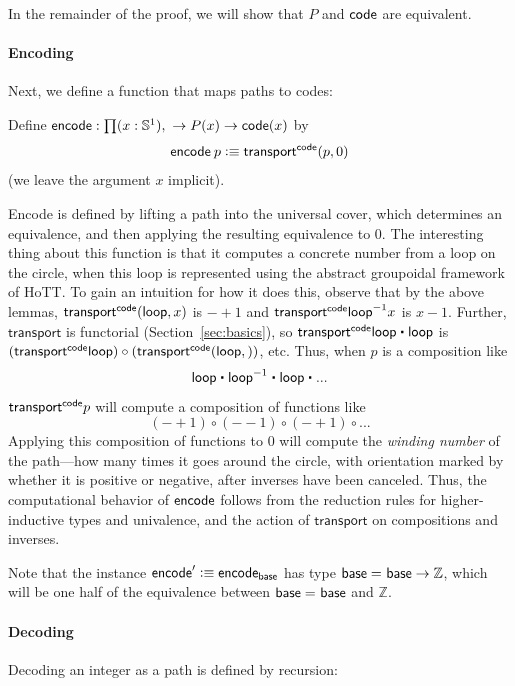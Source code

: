 In the remainder of the proof, we will show that $P$ and $\mathsf{code}$ are
equivalent.  

\paragraph{Encoding}

Next, we define a function \encode that maps paths to codes:
\begin{defn}
Define $\encode : \prd{x : \Sn ^1} \rightarrow P(x) \rightarrow  \code(x)$ by 
\[
\mathsf{encode} \: p \vcentcolon\equiv \mathsf{transport}^{\mathsf{code}}(p,0)
\]
(we leave the argument $x$ implicit).  
\end{defn}
Encode is defined by lifting a path into the universal cover, which
determines an equivalence, and then applying the resulting equivalence
to $0$.  
The interesting thing about this function is that it computes a concrete
number from a loop on the circle, when this loop is represented using
the abstract groupoidal framework of HoTT.  To gain an
intuition for how it does this, observe that by the above lemmas,
$\mathsf{transport}^{\mathsf{code}}(\mathsf{loop},x)$ is $-+1$ and $\mathsf{transport}^{\mathsf{code}} {\mathord{{\mathsf{loop}}^{-1}}} x$ is $x - 1$.  Further, $\mathsf{transport}$ is functorial
(Section~\ref{sec:basics}), so $\transfibf{\code} {\lloop \ct \lloop}$ is
$(\mathsf{transport}^{\mathsf{code}} \mathsf{loop}) \circ (\mathsf{transport}^{\mathsf{code}}(\mathsf{loop},))$, etc.  Thus, when $p$ is a
composition like 
\[
\lloop \ct \opp \lloop \ct \lloop \ct ...
\]
$\mathsf{transport}^{\mathsf{code}}{p}$ will compute a composition of functions like
\[
(- + 1) \circ (- -1) \circ (- + 1) \circ ... 
\]
Applying this composition of functions to 0 will compute the
\emph{winding number} of the path---how many times it goes around the
circle, with orientation marked by whether it is positive or negative,
after inverses have been canceled.  Thus, the computational behavior of
$\mathsf{encode}$ follows from the reduction rules for higher-inductive types and
univalence, and the action of $\mathsf{transport}$ on compositions and inverses.

Note that the instance $\mathsf{encode}' \vcentcolon\equiv \mathsf{encode}_{\mathsf{base}}$ has type 
$\mathsf{base} =_{} \mathsf{base} \rightarrow \mathbb{Z}$, which will be one half of the
equivalence between $\mathsf{base} =_{} \mathsf{base}$ and $\mathbb{Z}$.  

\paragraph{Decoding}  

Decoding an integer as a path is defined by recursion:

